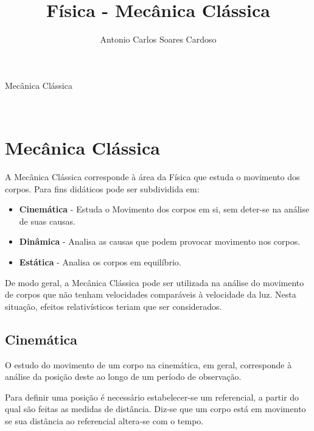 \documentclass[
    12pt, %
    openright,
    twoside, %
    a4paper, %
    article,
    english,brazil %
]{abntex2}
\author{Antonio Carlos Soares Cardoso}
\title{Física - Mecânica Clássica}
\makeatletter
\renewcommand\tableofcontents{%
  \null\hfill\textbf{\Large\contentsname}\hfill\null\par
  \@mkboth{\MakeUppercase\contentsname}{\MakeUppercase\contentsname}%
  \@starttoc{toc}%
}
\makeatother
\begin{document}
\begin{capa}
    \center
    \ABNTEXchapterfont\Large Mecânica Clássica\\
    \vspace*{1cm}
    {\ABNTEXchapterfont\large\imprimirautor}
    \vfill
    \begin{center}
    \ABNTEXchapterfont\bfseries\LARGE\imprimirtitulo
    \end{center}
    \vfill
    \large\imprimirlocal \\
    \large\imprimirdata
    \vspace*{1cm}
\end{capa}

\tableofcontents

\newpage

\textual

\section{Mecânica Clássica}

A Mecânica Clássica corresponde à área da Física que estuda o movimento dos corpos. Para fins didáticos pode ser subdividida em:

\begin{itemize}
    \item \textbf{Cinemática} - Estuda o Movimento dos corpos em si, sem deter-se na análise de suas causas.
    \item \textbf{Dinâmica} - Analisa as causas que podem provocar movimento nos corpos.
    \item \textbf{Estática} - Analisa os corpos em equilíbrio.
\end{itemize}

De modo geral, a Mecânica Clássica pode ser utilizada na análise do movimento de corpos que não tenham velocidades comparáveis à velocidade da luz. Nesta situação, efeitos relativísticos teriam que ser considerados.

\subsection{Cinemática}

O estudo do movimento de um corpo na cinemática, em geral, corresponde à análise da posição deste ao longo de um período de observação.

Para definir uma posição é necessário estabelecer-se um referencial, a partir do qual são feitas as medidas de distância. Diz-se que um corpo está em movimento se sua distância ao referencial altera-se com o tempo. 
\end{document}
